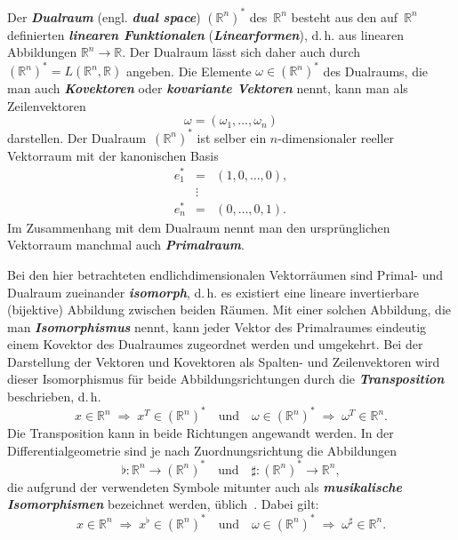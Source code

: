\documentclass[a4paper,twoside,english,ngerman,deutsch,german,sectrefs,envcountsame,envcountchap]{svmono}
\begin{document}
Der \textbf{\em Dualraum} (engl. \textbf{\em dual space}) $({\mathbb{R}}^{n})^{*}$ des~${\mathbb{R}}^{n}$ besteht aus den auf~${\mathbb{R}}^{n}$ definierten \textbf{\em linearen Funktionalen} (\textbf{\em Linearformen}), d.\,h. aus linearen Abbildungen ${\mathbb{R}}^{n}\to{\mathbb{R}}$. Der Dualraum lässt sich daher auch durch $({\mathbb{R}}^{n})^{*}=L({\mathbb{R}}^{n},{\mathbb{R}})$ angeben. Die Elemente $\omega\in({\mathbb{R}}^{n})^{*}$ des Dualraums, die man auch \textbf{\em Kovektoren} oder \textbf{\em kovariante Vektoren} nennt, kann man als Zeilenvektoren
\[
\omega=\left(\omega_{1},\ldots,\omega_{n}\right)
\]
darstellen. Der Dualraum~$({\mathbb{R}}^{n})^{*}$ ist selber ein $n$-dimensionaler reeller Vektorraum mit der kanonischen Basis
\[
\begin{array}{lcl}
e_{1}^{*} & = & \left(1,0,\ldots,0\right),\\
 & \vdots\\
e_{n}^{*} & = & (0,\ldots,0,1).
\end{array}
\]
Im Zusammenhang mit dem Dualraum nennt man den ursprünglichen Vektorraum manchmal auch \textbf{\em Primalraum}.

\begin{remark}
\label{rem:Isomorphismus-Primal-Dual}Bei den hier betrachteten endlichdimensionalen
Vektorräumen sind Primal- und Dualraum zueinander \textbf{\em isomorph}, d.\,h. es existiert eine lineare invertierbare (bijektive) Abbildung zwischen beiden Räumen. Mit einer solchen Abbildung, die man \textbf{\em Isomorphismus} nennt, kann jeder Vektor des Primalraumes eindeutig einem Kovektor des Dualraumes zugeordnet werden und umgekehrt. Bei der Darstellung der Vektoren und Kovektoren als Spalten- und Zeilenvektoren wird dieser Isomorphismus für beide Abbildungsrichtungen durch die \textbf{\em Transposition} beschrieben, d.\,h.
\[
x\in{\mathbb{R}}^{n}\;\Rightarrow\;x^{T}\in({\mathbb{R}}^{n})^{*}\quad\text{und}\quad\omega\in({\mathbb{R}}^{n})^{*}\;\Rightarrow\;\omega^{T}\in{\mathbb{R}}^{n}.
\]
Die Transposition kann in beide Richtungen angewandt werden. In der Differentialgeometrie sind je nach Zuordnungsrichtung die Abbildungen
\[
\flat:{\mathbb{R}}^{n}\to({\mathbb{R}}^{n})^{*}\quad\text{und}\quad\sharp:({\mathbb{R}}^{n})^{*}\to{\mathbb{R}}^{n},
\]
die aufgrund der verwendeten Symbole mitunter auch als \textbf{\em musikalische Isomorphismen} bezeichnet werden, üblich~\cite{marsden2001,bullo2004,jaenich2005}. Dabei gilt:
\[
x\in{\mathbb{R}}^{n}\;\Rightarrow\;x^{\flat}\in({\mathbb{R}}^{n})^{*}\quad\text{und}\quad\omega\in({\mathbb{R}}^{n})^{*}\;\Rightarrow\;\omega^{\sharp}\in{\mathbb{R}}^{n}.
\]
\end{remark}
\end{document}

